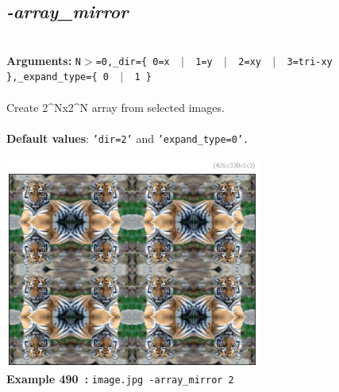 \documentclass[a4paper,11pt,twoside]{book}
\begin{document}
\subsection{\emph{-array\_mirror} }\vspace*{-0.5em}
~\\\textbf{Arguments: } 
{\small \texttt{N$>$=0,\_dir=\{ 0=x ~$|$~ 1=y ~$|$~ 2=xy ~$|$~ 3=tri-xy \},\_expand\_type=\{ 0 ~$|$~ 1 \}}}\\~\\
Create 2\textasciicircum Nx2\textasciicircum N array from selected images.
~\\~\\\textbf{Default values}: {\small \texttt{'dir=2'} and \texttt{'expand\_type=0'.}}
\begin{center}\includegraphics[keepaspectratio=true,height=7cm,width=\textwidth]{img/gmic_def490.jpg}\\
{\footnotesize \textbf{Example 490~:} \texttt{image.jpg -array\_mirror 2}}
\end{center}
\end{document}
